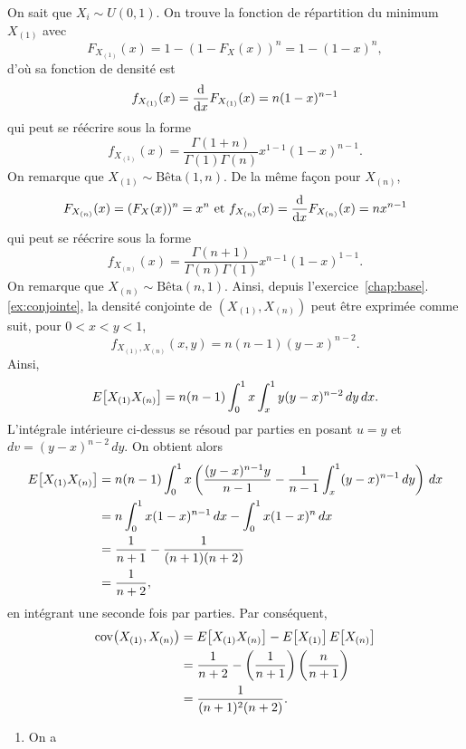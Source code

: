 \begin{solution}{1.22}
   On sait que $X_i \sim U(0, 1)$. On trouve la fonction de répartition du minimum $X_{(1)}$ avec
$$
   F_{X_{(1)}}(x)= 1 - (1 - F_X(x))^n = 1 - (1-x)^n ,
$$
   d'où sa fonction de densité est
$$
   f_{X_{(1)}}(x)=\frac{\mbox{d}}{\mbox{d} x} F_{X_{(1)}}(x) = n(1-x)^{n-1}
$$
 qui peut se réécrire sous la forme
 $$
 f_{X_{(1)}}(x)=\frac{\Gamma(1+n)}{\Gamma(1)\Gamma(n)}x^{1-1}(1-x)^{n-1}.
 $$
 On remarque que $X_{(1)} \sim \text{Bêta}(1, n)$. De la même façon pour $X_{(n)}$,
$$
   F_{X_{(n)}}(x)= (F_X(x))^n =x^n \text{ et }f_{X_{(n)}}(x)=\frac{\mbox{d}}{\mbox{d} x} F_{X_{(n)}}(x) = n x^{n-1}
$$
 qui peut se réécrire sous la forme
 $$
 f_{X_{(n)}}(x)=\frac{\Gamma(n+1)}{\Gamma(n)\Gamma(1)}x^{n-1}(1-x)^{1-1}.
 $$
 On remarque que $X_{(n)} \sim \text{Bêta}(n, 1)$. Ainsi, depuis l'exercice~\ref{chap:base}.\ref{ex:conjointe}, la densité conjointe de $(X_{(1)},X_{(n)})$ peut être exprimée comme suit, pour $0<x<y<1$,
$$
f_{X_{(1)},X_{(n)}}(x, y) = n(n - 1)(y - x)^{n-2}.
$$
Ainsi,
     \begin{equation*}
       E\! \left[ X_{(1)}X_{(n)} \right] = n (n - 1) \int_0^1 x \int_x^1
       y(y - x)^{n-2}\,dy\,dx.
     \end{equation*}
     L'intégrale intérieure ci-dessus se résoud par parties en posant
     $u = y$ et $dv = (y - x)^{n - 2}\,dy$. On obtient alors
     \begin{align*}
       E\! \left[ X_{(1)}X_{(n)} \right] &= n(n - 1) \int_0^1 x
       \left(
         \frac{(y-x)^{n-1}y}{n - 1} -
         \frac{1}{n - 1} \int_x^1 (y - x)^{n - 1}\, dy
       \right)\, dx\\
       &= n \int_0^1 x (1 - x)^{n-1}\, dx -
       \int_0^1 x (1 - x)^n \,dx \\
       &= \frac{1}{n+1} - \frac{1}{(n+1)(n+2)}\\
       &= \frac{1}{n+2},
     \end{align*}
     en intégrant une seconde fois par parties. Par conséquent,
     \begin{align*}
       \mathrm{cov}\! \left( X_{(1)}, X_{(n)} \right) &= E\! \left[ X_{(1)} X_{(n)} \right] -
       E\! \left[ X_{(1)} \right]E\! \left[ X_{(n)} \right] \\
       &= \frac{1}{n + 2} -
       \left(
         \frac{1}{n + 1}
       \right)
       \left(
         \frac{n}{n + 1}
       \right) \\
       &= \frac{1}{(n + 1)^2 (n + 2)}.
     \end{align*}
     \begin{enumerate}
       \item On a
         \begin{align*}

\end{align*}
\end{enumerate}
\end{solution}
